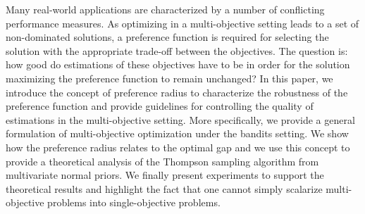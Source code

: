 
Many real-world applications are characterized by a number of conflicting performance measures. As optimizing in a multi-objective setting leads to a set of non-dominated solutions, a preference function is required for selecting the solution with the appropriate trade-off between the objectives. The question is: how good do estimations of these objectives have to be in order for the solution maximizing the preference function to remain unchanged? In this paper, we introduce the concept of preference radius to characterize the robustness of the preference function and provide guidelines for controlling the quality of estimations in the multi-objective setting. More specifically, we provide a general formulation of multi-objective optimization under the bandits setting. We show how the preference radius relates to the optimal gap and we use this concept to provide a theoretical analysis of the Thompson sampling algorithm from multivariate normal priors. We finally present experiments to support the theoretical results and highlight the fact that one cannot simply scalarize multi-objective problems into single-objective problems.
